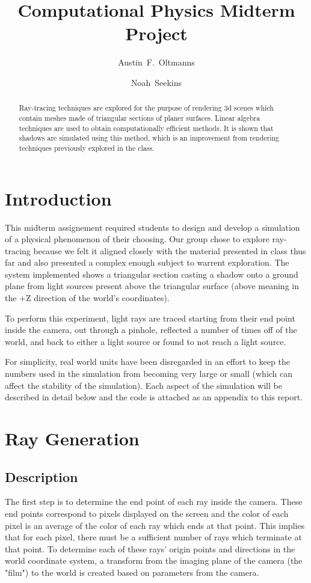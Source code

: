 \documentclass{article}
\begin{document}
\title{Computational Physics Midterm Project}
\author{
Austin~F.~Oltmanns
\and
Noah~Seekins
}

\maketitle

\begin{abstract}
Ray-tracing techniques are explored for the purpose of rendering 3d scenes which contain meshes made of
triangular sections of planer surfaces. Linear algebra techniques are used to obtain computationally 
efficient methods. It is shown that shadows are simulated using this method, which is an improvement 
from rendering techniques previously explored in the class.
\end{abstract} 

\section{Introduction}
This midterm assignement required students to design and develop a simulation of a physical phenomenon 
of their choosing. Our group chose to explore ray-tracing because we felt it aligned closely with the 
material presented in class thus far and also presented a complex enough subject to warrent exploration.
The system implemented shows a triangular section casting a shadow onto a ground plane from light sources
present above the triangular surface (above meaning in the +Z direction of the world's coordinates).

To perform this experiment, light rays are traced starting from their end point inside the camera, out through
a pinhole, reflected a number of times off of the world, and back to either a light source or found to not 
reach a light source.

For simplicity, real world units have been disregarded in an effort to keep the numbers used in the simulation from 
becoming very large or small (which can affect the stability of the simulation).
Each aspect of the simulation will be described in detail below and the code is attached as an appendix to this report.

\section{Ray Generation}
\subsection{Description}
The first step is to determine the end point of each ray inside the camera. These end points correspond to 
pixels displayed on the screen and the color of each pixel is an average of the color of each ray which ends
at that point. This implies that for each pixel, there must be a sufficient number of rays which terminate
at that point. To determine each of these rays' origin points and directions in the world coordinate system,
a transform from the imaging plane of the camera (the "film") to the world is created based on parameters from the camera.
\end{document}
